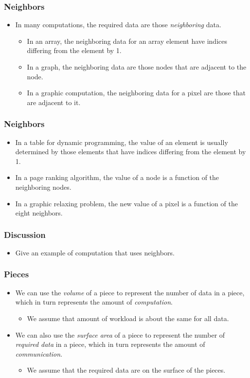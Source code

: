 \documentclass{beamer}
\begin{document}
\begin{CJK}{UTF8}{bsmi}
\begin{frame}
\frametitle{Neighbors}
\begin{itemize}
\item In many computations, the required data are those {\em neighboring} data.
\begin{itemize}
\item In an array, the neighboring data for an array element have indices differing from the element by 1.
\item In a graph, the neighboring data are those nodes that are adjacent to the node.
\item In a graphic computation, the neighboring data for a pixel are those that are adjacent to it.
\end{itemize}
\end{itemize}
\end{frame}


\begin{frame}
\frametitle{Neighbors}
\begin{itemize}
\item In a table for dynamic programming, the value of an element is usually determined by those elements that have indices differing from the element by 1.
\item In a page ranking algorithm, the value of a node is a function of the neighboring nodes.
\item In a graphic relaxing problem, the new value of a pixel is a function of the eight neighbors.
\end{itemize}
\end{frame}


\begin{frame}
\frametitle{Discussion}
\begin{itemize}
\item Give an example of computation that uses neighbors.
\end{itemize}
\end{frame}

\begin{frame}
\frametitle{Pieces}
\begin{itemize}
\item We can use the {\em volume} of a piece to represent the number of data in a piece, which in turn represents the amount of {\em computation}.
\begin{itemize}
\item We assume that amount of workload is about the same for all data.
\end{itemize}
\item We can also use the {\em surface area} of a piece to represent the number of {\em required data} in a piece, which in turn represents the amount of {\em communication}.
\begin{itemize}
\item We assume that the required data are on the surface of the
  pieces.
\end{itemize}
\end{itemize}
\end{frame}


\end{CJK}
\end{document}
